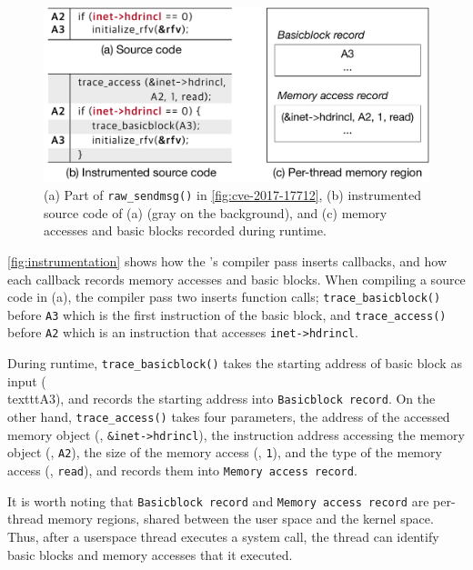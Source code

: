 \begin{figure}
  \centering
  \includegraphics[width=\linewidth]{fig/instrumentation.pdf}
  \caption{(a) Part of \texttt{raw_sendmsg()} in
    \autoref{fig:cve-2017-17712}, (b) instrumented source code of (a)
    (gray on the background), and (c) memory accesses and basic blocks
    recorded during runtime.}
  \label{fig:instrumentation}
\end{figure}

\autoref{fig:instrumentation} shows how the \sys's compiler pass
inserts callbacks, and how each callback records memory accesses and
basic blocks.
%
When compiling a source code in (a), the compiler pass two inserts
function calls; \texttt{trace_basicblock()} before \texttt{A3} which
is the first instruction of the basic block, and
\texttt{trace_access()} before \texttt{A2} which is an instruction
that accesses \texttt{inet->hdrincl}.


During runtime, \texttt{trace_basicblock()} takes the starting address
of basic block as input (\ie \\texttt{A3}), and records the starting
address into \texttt{Basicblock record}.
%
On the other hand, \texttt{trace_access()} takes four parameters, the
address of the accessed memory object (\ie, \texttt{\&inet->hdrincl}),
the instruction address accessing the memory object (\ie,
\texttt{A2}), the size of the memory access (\ie, \texttt{1}), and
the type of the memory access (\ie, \texttt{read}), and records them
into \texttt{Memory access record}.






It is worth noting that \texttt{Basicblock record} and \texttt{Memory
  access record} are per-thread memory regions, shared between the
user space and the kernel space. Thus, after a userspace thread
executes a system call, the thread can identify basic blocks and
memory accesses that it executed.







